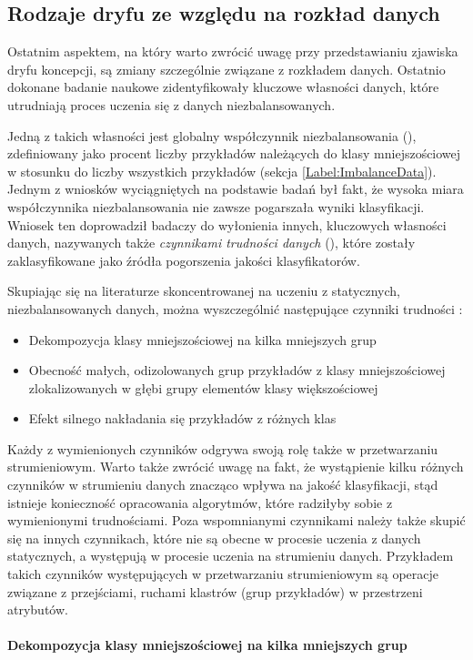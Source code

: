 \subsection{Rodzaje dryfu ze względu na rozkład danych}
\label{Section:DriftDataDistribution}

\noindent Ostatnim aspektem, na który warto zwrócić uwagę przy przedstawianiu zjawiska dryfu koncepcji, są zmiany szczególnie związane z rozkładem danych. Ostatnio dokonane badanie naukowe zidentyfikowały kluczowe własności danych, które utrudniają proces uczenia się z danych niezbalansowanych.

Jedną z takich własności jest globalny współczynnik niezbalansowania (), zdefiniowany jako procent liczby przykładów należących do klasy mniejszościowej w stosunku do liczby wszystkich przykładów (sekcja \ref{Label:ImbalanceData}). Jednym z wniosków wyciągniętych na podstawie badań był fakt, że wysoka miara współczynnika niezbalansowania nie zawsze pogarszała wyniki klasyfikacji. Wniosek ten doprowadził badaczy do wyłonienia innych, kluczowych własności danych, nazywanych także \textit{czynnikami trudności danych} (), które zostały zaklasyfikowane jako źródła pogorszenia jakości klasyfikatorów.

Skupiając się na literaturze skoncentrowanej na uczeniu z statycznych, niezbalansowanych danych, można wyszczególnić następujące czynniki trudności \cite{Book:DataDistribution}\cite{Article:DataDistribution}:

\begin{itemize}
    \item Dekompozycja klasy mniejszościowej na kilka mniejszych grup
    \item Obecność małych, odizolowanych grup przykładów z klasy mniejszościowej zlokalizowanych w głębi grupy elementów klasy większościowej
    \item Efekt silnego nakładania się przykładów z różnych klas
\end{itemize}

\noindent Każdy z wymienionych czynników odgrywa swoją rolę także w przetwarzaniu strumieniowym. Warto także zwrócić uwagę na fakt, że wystąpienie kilku różnych czynników w strumieniu danych znacząco wpływa na jakość klasyfikacji, stąd istnieje konieczność opracowania algorytmów, które radziłyby sobie z wymienionymi trudnościami. Poza wspomnianymi czynnikami należy także skupić się na innych czynnikach, które nie są obecne w procesie uczenia z danych statycznych, a występują w procesie uczenia na strumieniu danych. Przykładem takich czynników występujących w przetwarzaniu strumieniowym są operacje związane z przejściami, ruchami klastrów (grup przykładów) w przestrzeni atrybutów.\\\\
\textbf{Dekompozycja klasy mniejszościowej na kilka mniejszych grup}\\

